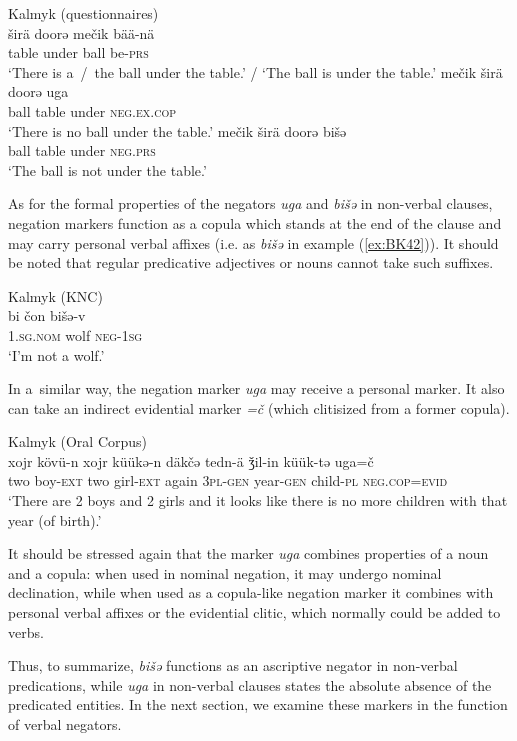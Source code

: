 \documentclass[output=paper]{langsci/langscibook}
\begin{document}
\ea Kalmyk (questionnaires) \label{ex:BK41}\\
  \ea
	\gll širä	doorǝ		mečik		bää-nä\\
	table	under		ball		be-\textsc{prs}\\
	\glt `There is a / the ball under the table.’ / ‘The ball is under the table.'
  \ex
	\gll mečik		širä		doorǝ		uga\\
	ball		table		under		\textsc{neg.ex.cop}\\
	\glt `There is no ball under the table.'
  \ex
	\gll mečik		širä	doorǝ		bišǝ\\
	ball		table	under		\textsc{neg.prs}\\
	\glt `The ball is not under the table.'
\z \z

As for the formal properties of the negators \textit{uga} and \textit{bišǝ} in non-verbal clauses, negation markers function as a copula which stands at the end of the clause and may carry personal verbal affixes (i.e. as \textit{bišǝ} in example (\ref{ex:BK42})). It should be noted that regular predicative adjectives or nouns cannot take such suffixes.

\ea Kalmyk (KNC) \label{ex:BK42}\\
	\gll bi				čon	bišə-v\\
	\textsc{1.sg.nom}	wolf	\textsc{neg-1sg}\\
	\glt `I’m not a wolf.'
\z


In a similar way, the negation marker \textit{uga} may receive a personal marker. It also can take an indirect evidential marker \textit{=č} (which clitisized from a former copula).

\ea Kalmyk (Oral Corpus) \label{ex:BK43}\\
	\gll xojr	kövü-n		xojr	küükǝ-n	däkčǝ		tedn-ä	ǯil-in			küük-tǝ	uga=č\\
	two	boy-\textsc{ext}		two	girl-\textsc{ext}	again		\textsc{3pl-gen}	year-\textsc{gen}		child-\textsc{pl}	\textsc{neg.cop=evid}\\
	\glt `There are 2 boys and 2 girls and it looks like there is no more children with that year (of birth).'
\z


It should be stressed again that the marker \textit{uga} combines properties of a noun and a copula: when used in nominal negation, it may undergo nominal declination, while when used as a copula-like negation marker it combines with personal verbal affixes or the evidential clitic, which normally could be added to verbs.

Thus, to summarize, \textit{bišǝ} functions as an ascriptive negator in non-verbal predications, while \textit{uga} in non-verbal clauses states the absolute absence of the predicated entities. In the next section, we examine these markers in the function of verbal negators.
\end{document}
